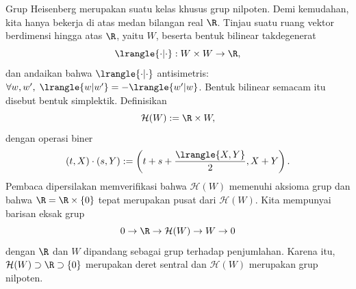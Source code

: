 \begin{example}
	Grup Heisenberg merupakan suatu kelas khusus grup nilpoten. Demi kemudahan, kita hanya bekerja di atas medan bilangan real $\R$. Tinjau suatu ruang vektor berdimensi hingga atas $\R$, yaitu $W$, beserta bentuk bilinear takdegenerat
	\[ \lrangle{\cdot|\cdot}: W \times W \to \R, \]
	dan andaikan bahwa $\lrangle{\cdot|\cdot}$ antisimetris: $\forall w, w', \; \lrangle{w|w'} = -\lrangle{w'|w}$. Bentuk bilinear semacam itu disebut bentuk simplektik. Definisikan
	\[ \mathcal{H}(W) := \R \times W, \]
	dengan operasi biner
	\[ (t, X) \cdot (s, Y) := \left( t+s+\frac{\lrangle{X,Y}}{2}, X+Y \right). \]
	Pembaca dipersilakan memverifikasi bahwa $\mathcal{H}(W)$ memenuhi aksioma grup dan bahwa $\R = \R \times \{0\}$ tepat merupakan pusat dari $\mathcal{H}(W)$. Kita mempunyai barisan eksak grup
	\[ 0 \to \R \to \mathcal{H}(W) \to W \to 0 \]
	dengan $\R$ dan $W$ dipandang sebagai grup terhadap penjumlahan. Karena itu, $\mathcal{H}(W) \supset \R \supset \{0\}$ merupakan deret sentral dan $\mathcal{H}(W)$ merupakan grup nilpoten.


\end{example}
